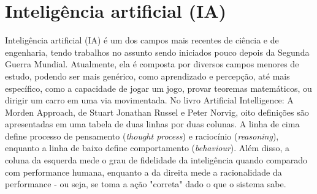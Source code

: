 % 
\section{Inteligência artificial (IA)}
\label{sec:ia}

Inteligência artificial (IA) é um dos campos mais recentes de ciência e de engenharia, tendo trabalhos no assunto sendo iniciados pouco depois da Segunda Guerra Mundial. Atualmente, ela é composta por diversos campos menores de estudo, podendo ser mais genérico, como aprendizado e percepção, até mais específico, como a capacidade de jogar um jogo, provar teoremas matemáticos, ou dirigir um carro em uma via movimentada.
No livro Artificial Intelligence: A Morden Approach, de Stuart Jonathan Russel e Peter Norvig, oito definições são apresentadas em uma tabela de duas linhas por duas colunas. A linha de cima define processo de pensamento (\textit{thought process}) e raciocínio (\textit{reasoning}), enquanto a linha de baixo define comportamento (\textit{behaviour}). Além disso, a coluna da esquerda mede o grau de fidelidade da inteligência quando comparado com performance humana, enquanto a da direita mede a racionalidade da performance - ou seja, se toma a ação "correta" dado o que o sistema sabe.

